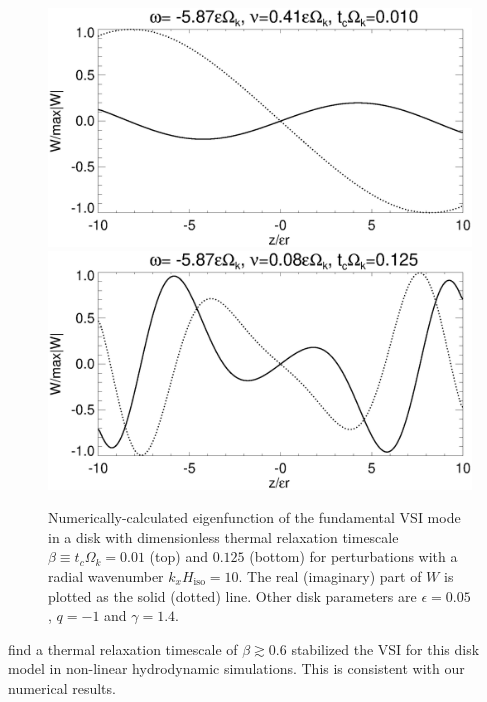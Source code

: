 \begin{figure}
  \includegraphics[width=\linewidth,clip=true,trim=0cm 1.75cm 0cm 0cm]{figures/eigenvectorW_beta0d01}
  \includegraphics[width=\linewidth,clip=true,trim=0cm 0cm 0cm 0cm]{figures/eigenvectorW_beta0d125}
  \caption{Numerically-calculated eigenfunction of the fundamental VSI
    mode in a disk with dimensionless thermal relaxation timescale
    $\beta \equiv t_c\Omega_k = 0.01$ (top) and $0.125$ (bottom) for
    perturbations with a radial wavenumber $k_xH_\mathrm{iso}=10$. The
    real (imaginary) part of $W$ is plotted as the solid (dotted)
    line. Other disk parameters are
    $\epsilon=0.05$, $q=-1$ and $\gamma=1.4$.
    \label{relax_eigenW_num}}  
\end{figure}


\citeauthor{nelson13} find a thermal relaxation timescale of
$\beta\gtrsim 0.6$ stabilized the VSI for this disk model in non-linear
hydrodynamic simulations. This is consistent with our numerical
results.    